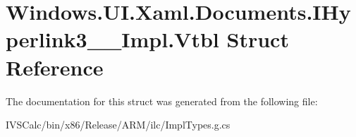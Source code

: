 \hypertarget{struct_windows_1_1_u_i_1_1_xaml_1_1_documents_1_1_i_hyperlink3_____impl_1_1_vtbl}{}\section{Windows.\+U\+I.\+Xaml.\+Documents.\+I\+Hyperlink3\+\_\+\+\_\+\+Impl.\+Vtbl Struct Reference}
\label{struct_windows_1_1_u_i_1_1_xaml_1_1_documents_1_1_i_hyperlink3_____impl_1_1_vtbl}


The documentation for this struct was generated from the following file\+:\begin{DoxyCompactItemize}
\item 
I\+V\+S\+Calc/bin/x86/\+Release/\+A\+R\+M/ilc/Impl\+Types.\+g.\+cs\end{DoxyCompactItemize}
